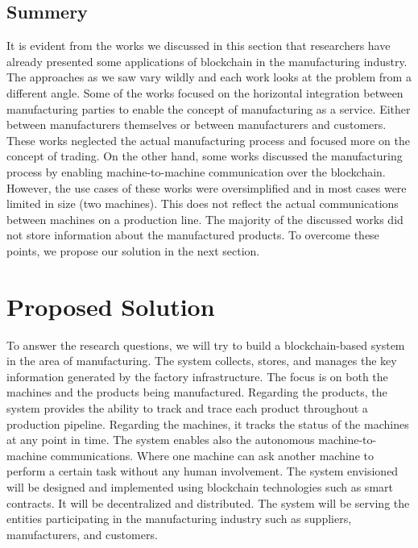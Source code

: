 \documentclass[runningheads]{llncs}
\begin{document}
\subsection{Summery}
It is evident from the works we discussed in this section that researchers have already presented some applications of blockchain in the manufacturing industry. The approaches as we saw vary wildly and each work looks at the problem from a different angle. Some of the works focused on the horizontal integration between manufacturing parties to enable the concept of manufacturing as a service. Either between manufacturers themselves or between manufacturers and customers. These works neglected the actual manufacturing process and focused more on the concept of trading. On the other hand, some works discussed the manufacturing process by enabling machine-to-machine communication over the blockchain. However, the use cases of these works were oversimplified and in most cases were limited in size (two machines). This does not reflect the actual communications between machines on a production line. The majority of the discussed works did not store information about the manufactured products. To overcome these points, we propose our solution in the next section.


\section{Proposed Solution}
To answer the research questions, we will try to build a blockchain-based system in the area of manufacturing. The system collects, stores, and manages the key information generated by the factory infrastructure. The focus is on both the machines and the products being manufactured. Regarding the products, the system provides the ability to track and trace each product throughout a production pipeline. Regarding the machines, it tracks the status of the machines at any point in time. The system enables also the autonomous machine-to-machine communications. Where one machine can ask another machine to perform a certain task without any human involvement. The system envisioned will be designed and implemented using blockchain technologies such as smart contracts. It will be decentralized and distributed. The system will be serving the entities participating in the manufacturing industry such as suppliers, manufacturers, and customers. 

\bigbreak 
\end{document}
